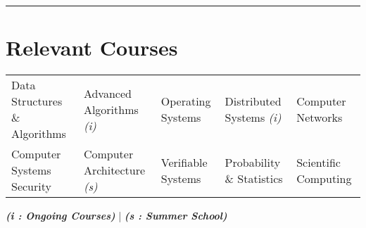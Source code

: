\documentclass[10pt, margin=0.5in]{deedy-resume-openfont}
\begin{document}
\begin{minipage}[t]{0.48\textwidth}
\end{minipage}

\vspace{4pt}				%
\rule{\textwidth}{0.5pt}	%
\vspace{-18pt}				%

\section{\hspace{0.5cm}Relevant Courses}
\hspace{-6pt} \begin{tabular*}{\textwidth}{lllll}
Data Structures \& Algorithms & Advanced Algorithms \textit{(i)} & Operating Systems & Distributed Systems \textit{(i)} & Computer Networks \\
Computer Systems Security & Computer Architecture \textit{(s)} & Verifiable Systems & Probability \& Statistics &  Scientific Computing
\end{tabular*}


\hspace{-2pt} {\footnotesize \textit{\textbf{ (i : Ongoing Courses)}} | \textit{\textbf{ (s : Summer School)}}}
\end{document}
